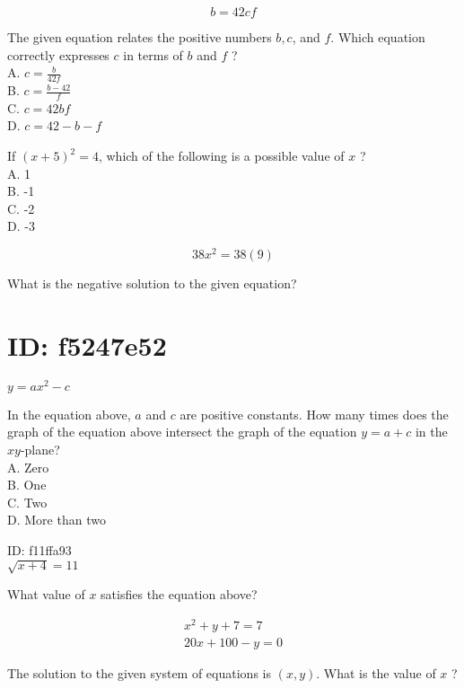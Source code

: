$$
b=42 c f
$$

The given equation relates the positive numbers $b, c$, and $f$. Which equation correctly expresses $c$ in terms of $b$ and $f$ ?\\
A. $c=\frac{b}{42 f}$\\
B. $c=\frac{b-42}{f}$\\
C. $c=42 b f$\\
D. $c=42-b-f$

If $(x+5)^{2}=4$, which of the following is a possible value of $x$ ?\\
A. 1\\
B. -1\\
C. -2\\
D. -3

$$
38 x^{2}=38(9)
$$

What is the negative solution to the given equation?

\section*{ID: f5247e52}
$y=a x^{2}-c$

In the equation above, $a$ and $c$ are positive constants. How many times does the graph of the equation above intersect the graph of the equation $y=a+c$ in the $x y$-plane?\\
A. Zero\\
B. One\\
C. Two\\
D. More than two

ID: f11ffa93\\
$\sqrt{x+4}=11$

What value of $x$ satisfies the equation above?

$$
\begin{gathered}
x^{2}+y+7=7 \\
20 x+100-y=0
\end{gathered}
$$

The solution to the given system of equations is $(x, y)$. What is the value of $x$ ?


